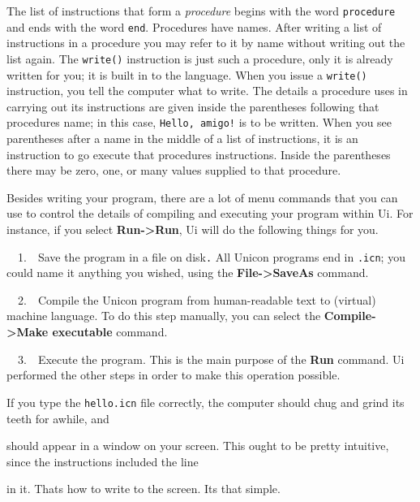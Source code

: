 The list of instructions that form a \textit{procedure }begins with the
word \texttt{procedure} and ends with the word \texttt{end}. Procedures
have names. After writing a list of instructions in a procedure you may
refer to it by name without writing out the list again. The
\texttt{write()} instruction is just such a procedure, only it is
already written for you; it is built in to the language. When you issue
a \texttt{write()} instruction, you tell the computer what to
write. The details a procedure uses in carrying out its instructions
are given inside the parentheses following that
procedure{\textquotesingle}s name; in this case,
\texttt{{\textquotedbl}Hello, amigo!{\textquotedbl}} is to be written.
When you see parentheses after a name in the middle of
a list of instructions, it is an instruction to go execute that
procedure{\textquotesingle}s instructions. Inside the parentheses there
may be zero, one, or many values supplied to that procedure.

Besides writing your program, there are a lot of menu commands that you
can use to control the details of compiling and executing your program
within Ui. For instance, if you select \textbf{Run-{\textgreater}Run},
Ui will do the following things for you.

\ \ 1.\ \ Save the program in a file on disk\texttt{.} All Unicon
programs end in \texttt{.icn}; you could name it anything you wished,
using the \textbf{File-{\textgreater}SaveAs} command.

\ \ 2.\ \ Compile the Unicon program from human-readable text to
(virtual) machine language. To do this step manually, you can select
the\newline
\textbf{Compile-{\textgreater}Make executable} command.

\ \ 3.\ \ Execute the program. This is the main purpose of the
\textbf{Run} command. Ui performed the other steps in order to make
this operation possible.

If you type the \texttt{hello.icn} file correctly, the computer should
chug and grind its teeth for awhile, and


\noindent should appear in a window on your screen. This ought to be pretty
intuitive, since the instructions included the line


\noindent in it. That{\textquotesingle}s how to write to the screen.
It{\textquotesingle}s that simple.

